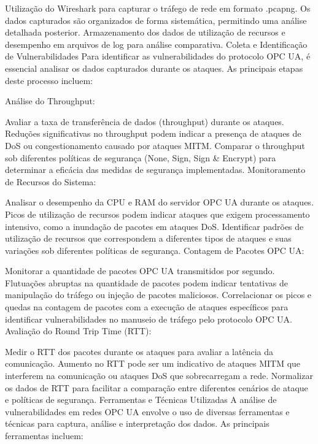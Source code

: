 {    Utilização do Wireshark para capturar o tráfego de rede em formato .pcapng. Os dados capturados são organizados de forma sistemática, permitindo uma análise detalhada posterior.
    Armazenamento dos dados de utilização de recursos e desempenho em arquivos de log para análise comparativa.
    Coleta e Identificação de Vulnerabilidades
    Para identificar as vulnerabilidades do protocolo OPC UA, é essencial analisar os dados capturados durante os ataques. As principais etapas deste processo incluem:

    Análise do Throughput:

    Avaliar a taxa de transferência de dados (throughput) durante os ataques. Reduções significativas no throughput podem indicar a presença de ataques de DoS ou congestionamento causado por ataques MITM.
    Comparar o throughput sob diferentes políticas de segurança (None, Sign, Sign \& Encrypt) para determinar a eficácia das medidas de segurança implementadas.
    Monitoramento de Recursos do Sistema:

    Analisar o desempenho da CPU e RAM do servidor OPC UA durante os ataques. Picos de utilização de recursos podem indicar ataques que exigem processamento intensivo, como a inundação de pacotes em ataques DoS.
    Identificar padrões de utilização de recursos que correspondem a diferentes tipos de ataques e suas variações sob diferentes políticas de segurança.
    Contagem de Pacotes OPC UA:

    Monitorar a quantidade de pacotes OPC UA transmitidos por segundo. Flutuações abruptas na quantidade de pacotes podem indicar tentativas de manipulação do tráfego ou injeção de pacotes maliciosos.
    Correlacionar os picos e quedas na contagem de pacotes com a execução de ataques específicos para identificar vulnerabilidades no manuseio de tráfego pelo protocolo OPC UA.
    Avaliação do Round Trip Time (RTT):

    Medir o RTT dos pacotes durante os ataques para avaliar a latência da comunicação. Aumento no RTT pode ser um indicativo de ataques MITM que interferem na comunicação ou ataques DoS que sobrecarregam a rede.
    Normalizar os dados de RTT para facilitar a comparação entre diferentes cenários de ataque e políticas de segurança.
    Ferramentas e Técnicas Utilizadas
    A análise de vulnerabilidades em redes OPC UA envolve o uso de diversas ferramentas e técnicas para captura, análise e interpretação dos dados. As principais ferramentas incluem:

}
